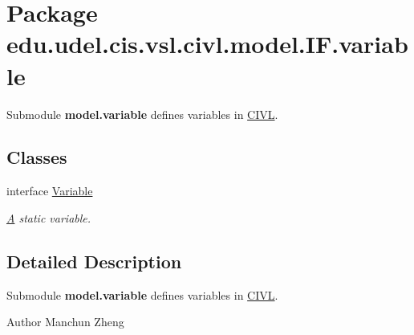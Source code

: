 \hypertarget{namespaceedu_1_1udel_1_1cis_1_1vsl_1_1civl_1_1model_1_1IF_1_1variable}{}\section{Package edu.\+udel.\+cis.\+vsl.\+civl.\+model.\+I\+F.\+variable}
\label{namespaceedu_1_1udel_1_1cis_1_1vsl_1_1civl_1_1model_1_1IF_1_1variable}


Submodule {\bfseries model.\+variable} defines variables in \hyperlink{classedu_1_1udel_1_1cis_1_1vsl_1_1civl_1_1CIVL}{C\+I\+V\+L}.  


\subsection*{Classes}
\begin{DoxyCompactItemize}
\item 
interface \hyperlink{interfaceedu_1_1udel_1_1cis_1_1vsl_1_1civl_1_1model_1_1IF_1_1variable_1_1Variable}{Variable}
\begin{DoxyCompactList}\small\item\em \hyperlink{structA}{A} static variable. \end{DoxyCompactList}\end{DoxyCompactItemize}


\subsection{Detailed Description}
Submodule {\bfseries model.\+variable} defines variables in \hyperlink{classedu_1_1udel_1_1cis_1_1vsl_1_1civl_1_1CIVL}{C\+I\+V\+L}. 

\begin{DoxyAuthor}{Author}
Manchun Zheng 
\end{DoxyAuthor}
